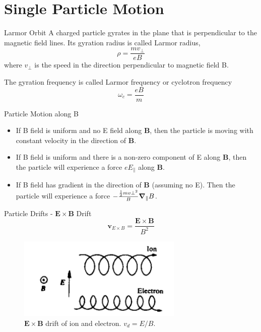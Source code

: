 \section{Single Particle Motion}
\begin{frame}{Larmor Orbit}
    A charged particle gyrates in the plane that is perpendicular to the magnetic field lines. Its gyration radius is called Larmor radius,
    \begin{equation}
        \rho = \frac{mv_\perp}{eB}
        \label{eq:larmor-radius}
    \end{equation}
    where $v_\perp$ is the speed in the direction perpendicular to magnetic field B.

    The gyration frequency is called Larmor frequency or cyclotron frequency
    \begin{equation}
        \omega_c = \frac{eB}{m}
        \label{eq:cyclotron-frequency}
    \end{equation}
\end{frame}

\begin{frame}{Particle Motion along B}
    \begin{itemize}
        \item If B field is uniform and no E field along $\mathbf{B}$, then the particle is moving with constant velocity in the direction of $\mathbf{B}$.
        \item If B field is uniform and there is a non-zero component of E along $\mathbf{B}$, then the particle will experience a force $eE_\parallel$ along $\mathbf{B}$.
        \item If B field has gradient in the direction of $\mathbf{B}$ (assuming no E). Then the particle will experience a force $-\frac{\frac{1}{2}mv\perp^2}{B}\grad_\parallel B$.
    \end{itemize}
\end{frame}

\begin{frame}{Particle Drifts - $\mathbf{E\times B}$ Drift}
    \begin{equation}
        \mathbf{v}_{E\times B} = \frac{\mathbf{E\times B}}{B^2}
        \label{eq:e-cross-b-drift}
    \end{equation}
    \begin{figure}
        \centering
        \includegraphics[width=0.7\textwidth]{figures/e-cross-b-drift.png}
        \caption{$\mathbf{E\times B}$ drift of ion and electron. $v_d=E/B$.}
        \label{fig:e-cross-b-drift}
    \end{figure}
\end{frame}

